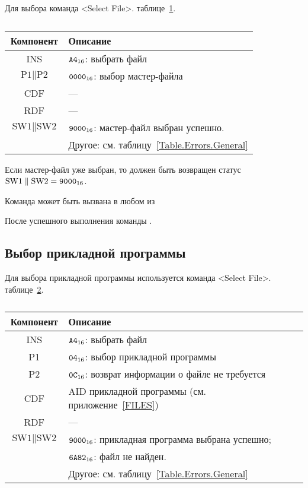 Для выбора  команда 
<Select File>.  
таблице~\ref{Table.Oper.SelectMFCmd}. 

\begin{table}[hbt]
\caption{}\label{Table.Oper.SelectMFCmd}
\begin{tabular}{|c|p{14cm}|}
\hline
Компонент & Описание \\
\hline
\hline
INS & $\texttt{A4}_{16}$: выбрать файл\\ 
\hline
$\text{P1} \parallel \text{P2}$ & $\texttt{0000}_{16}$: выбор мастер-файла\\
\hline
CDF & --- \\
\hline 
RDF &  --- \\
\hline
$\text{SW1}\parallel\text{SW2}$ & 
$\texttt{9000}_{16}$: мастер-файл выбран успешно. \\
  & Другое: см. таблицу~\ref{Table.Errors.General} \\
\hline
\end{tabular}
\end{table}

Если мастер-файл уже выбран, то должен быть возвращен 
статус $\text{SW1} \parallel \text{SW2} = \texttt{9000}_{16}$.

Команда может быть вызвана в любом из 

После успешного выполнения команды .

\subsection{Выбор прикладной программы}
\label{Oper.Descr.SelectApp}

Для выбора прикладной программы используется команда <Select File>. 
 таблице~\ref{Table.Oper.SelectAppCmd}.

\begin{table}[hbt]
\caption{}\label{Table.Oper.SelectAppCmd}
\begin{tabular}{|c|p{14cm}|}
\hline
Компонент & Описание \\
\hline
\hline
INS & $\texttt{A4}_{16}$: выбрать файл\\ 
\hline
P1 & $\texttt{04}_{16}$: выбор прикладной программы\\
\hline
P2 & $\texttt{0C}_{16}$: возврат информации о файле не требуется \\
\hline
CDF & AID прикладной программы (см. приложение~\ref{FILES})\\
\hline 
RDF &  --- \\
\hline
$\text{SW1}\parallel\text{SW2}$ & 
$\texttt{9000}_{16}$: прикладная программа выбрана успешно; \\
  & $\texttt{6A82}_{16}$: файл не найден. \\
  & Другое: см. таблицу~\ref{Table.Errors.General}\\
\hline
\end{tabular}
\end{table}

